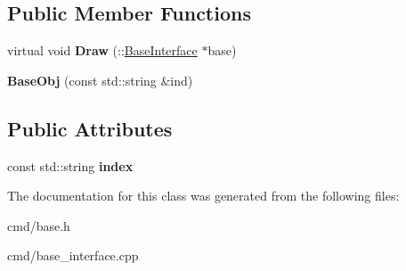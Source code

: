 \subsection*{Public Member Functions}
\begin{DoxyCompactItemize}
\item 
virtual void {\bfseries Draw} (\+::\hyperlink{classBaseInterface}{Base\+Interface} $\ast$base)\hypertarget{classBaseInterface_1_1Room_1_1BaseObj_a700a084816971d2d3687df42c9b6755e}{}\label{classBaseInterface_1_1Room_1_1BaseObj_a700a084816971d2d3687df42c9b6755e}

\item 
{\bfseries Base\+Obj} (const std\+::string \&ind)\hypertarget{classBaseInterface_1_1Room_1_1BaseObj_a7c97e4ff6607ec39c72d0248d069c382}{}\label{classBaseInterface_1_1Room_1_1BaseObj_a7c97e4ff6607ec39c72d0248d069c382}

\end{DoxyCompactItemize}
\subsection*{Public Attributes}
\begin{DoxyCompactItemize}
\item 
const std\+::string {\bfseries index}\hypertarget{classBaseInterface_1_1Room_1_1BaseObj_a41339546ed7f07104e6f3425c53a106c}{}\label{classBaseInterface_1_1Room_1_1BaseObj_a41339546ed7f07104e6f3425c53a106c}

\end{DoxyCompactItemize}


The documentation for this class was generated from the following files\+:\begin{DoxyCompactItemize}
\item 
cmd/base.\+h\item 
cmd/base\+\_\+interface.\+cpp\end{DoxyCompactItemize}
